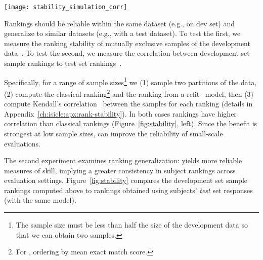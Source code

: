 \begin{figure*}[t]
    \centering
    \texttt{[image: stability\_simulation\_corr]}
    \caption{
        Compared to the final ranking over a large test set, how well does a small test set correlate?
        The left shows correlation between mutually exclusive development set samples and the right between development samples and the full test set.
        In both experiments (panes), ranking systems by \irt{} ability is more stable---across all sample sizes---than mean accuracy and thus more reliable (Kendall's rank correlation is higher).
        Bands show 95\% confidence intervals of rank correlations across ten trials per sample size.
    }
    \label{fig:stability}
\end{figure*}

Rankings should be reliable within the same dataset (e.g., on dev
set) and generalize to similar datasets (e.g., with a test dataset).
%
To test the first, we measure the ranking stability of mutually
exclusive samples of the development
data~\cite{buckley2000measure}.
%
To test the second, we measure the correlation between
development set sample rankings to test set rankings~\citep{voorhees1998var}.

Specifically, for a range of sample sizes\footnote{ The sample size
    must be less than half the size of the development data so that we
    can obtain two samples.  } we (1) sample two partitions of the data,
(2) compute the classical ranking\footnote{For \squad{}, ordering by
    mean exact match score.} and the \irt{} ranking from a refit
~model, then (3) compute Kendall's
correlation~\citep{kendall1938tau} between the samples for each
ranking (details in Appendix~\ref{ch:isicle:apx:rank-stability}).
%
In both cases \irt{} rankings have higher correlation than classical
rankings (Figure~\ref{fig:stability}, left).
%
Since the benefit is strongest at low sample sizes, \irt{} can improve
the reliability of small-scale evaluations.

The second experiment examines ranking generalization: \irt{} yields more reliable measures of \subj{} skill,  implying a greater consistency in subject rankings across evaluation settings.
Figure~\ref{fig:stability} compares the development set sample rankings computed above to rankings obtained using subjects' \emph{test} set responses (with the same \irt{} model).

